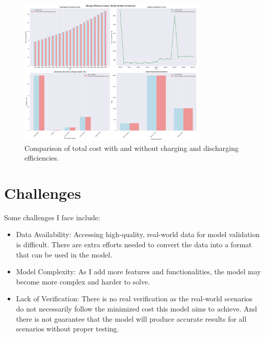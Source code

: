 \documentclass[11pt]{article}
\begin{document}
\begin{figure}[H]
    \centering
    \includegraphics[width=0.8\textwidth]{storage_comparison_output/storage_efficiency_impact_analysis.png}
    \caption{Comparison of total cost with and without charging and discharging efficiencies.}
    \label{fig:efficiency_total_cost}
\end{figure}


\section{Challenges}
Some challenges I face include:
\begin{itemize}
    \item Data Availability: Accessing high-quality, real-world data for model validation is difficult. There are extra efforts needed to convert the data into a format that can be used in the model.
    \item Model Complexity: As I add more features and functionalities, the model may become more complex and harder to solve.
    \item Lack of Verification: There is no real verification as the real-world scenarios do not necessarily follow the minimized cost this model aims to achieve. And there is not guarantee that the model will produce accurate results for all scenarios without proper testing.
\end{itemize}




\end{document}
